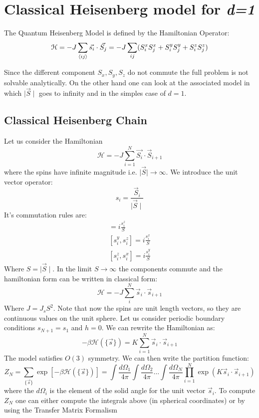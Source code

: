 \documentclass[../../Main/Main.tex]{subfiles}
\begin{document}
\section{Classical Heisenberg model for \emph{d=1} }

The Quantum Heisenberg Model is defined by the Hamiltonian Operator:
$$\mathcal{H} = - J \sum_{{\left< ij \right>} } \vec{s_{i}}\cdot \vec{S_{j}} = - J \sum_{ij} (S_{i}^{x}S_{j}^{x} + S_{i}^{y}S_{j}^{y} + S_{i}^{z}S_{j}^{z})$$

Since the different component $S_{x},S_{y},S_{z}$ do not commute the full problem is not solvable analytically.
On the other hand one can look at the associated model in which $\mid \vec{S}\mid$ goes to infinity and in the simples case of $d = 1$.



\subsection{Classical Heisenberg Chain}
Let us consider the Hamiltonian
$$\mathcal{H} = - J \sum_{i=1}^{N} \vec{S_{i}} \cdot \vec{S}_{i+1}$$
where the spins have infinite magnitude i.e. $\mid \vec{S}\mid \to \infty$.
We introduce the unit vector operator:
$$s_{i} = \frac{\vec{S}_{i}}{\mid \vec{S}\mid}$$
It's commutation rules are:
\begin{align}
[s^{x}_{i},s_{i}^{y}] = i \frac{s_{i}^{z}}{S} \\
[s^{y}_{i},s_{i}^{z}] = i \frac{s_{i}^{x}}{S} \\
[s^{z}_{i},s_{i}^{x}] = i \frac{s_{i}^{y}}{S}
\end{align}
Where $S = \mid \vec{S}\mid$.
In the limit $S \to \infty$ the components commute and the hamiltonian form can be written in classical form:
$$\mathcal{H} = - J\sum_{i}^{N} \vec{s}_{i} \cdot \vec{s}_{i+1}$$
Where $J = J_{s}S^{2}$.
Note that now the spins are unit length vectors, so they are continuous values on the unit sphere.
Let us consider periodic boundary conditions $s_{N+1} = s_{1}$ and $h = 0$. We can rewrite the Hamiltonian as:
$$-\beta \mathcal{H}(\{ \vec{s} \}) = K \sum_{i=1}^{N}\vec{s}_{i}\cdot \vec{s}_{i+1}$$
The model satisfies $O(3)$ symmetry. We can then write the partition function:
$$Z_{N} = \sum_{\{ \vec{s} \}} \exp[-\beta \mathcal{H}(\{ \vec{s} \})] = \int \frac{d\Omega_{1}}{4\pi}\int \frac{d\Omega_{2}}{4\pi}\dots\int \frac{d\Omega_{N}}{4\pi}\prod_{i=1}^{N} \exp(K \vec{s}_{i}\cdot \vec{s}_{i+1})$$
where the $d\Omega_i$ is the element of the solid angle for the unit vector $\vec{s}_{i}$.
To compute $Z_{N}$ one can either compute the integrals above (in spherical coordinates) or by using the Transfer Matrix Formalism
\end{document}
